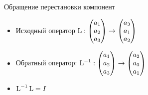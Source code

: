 \begin{frame}{Обращение перестановки компонент}

\begin{itemize}[<+->]
    \item 
Исходный оператор $\operatorname{L} : \begin{pmatrix}
  a_1 \\
  a_2 \\
  a_3 \\
\end{pmatrix} \to
\begin{pmatrix}
a_3 \\
a_1 \\
a_2 \\
\end{pmatrix}
$

\item \alert{Обратный оператор}:  
$\operatorname{L}^{-1} : \begin{pmatrix}
a_1 \\
a_2 \\
a_3 \\
    \end{pmatrix} \to
  \begin{pmatrix}
a_2 \\
a_3 \\
a_1 \\
    \end{pmatrix}
  $

\item $\operatorname{L}^{-1} \operatorname{L} = I$
\end{itemize}


\end{frame}


    
    


